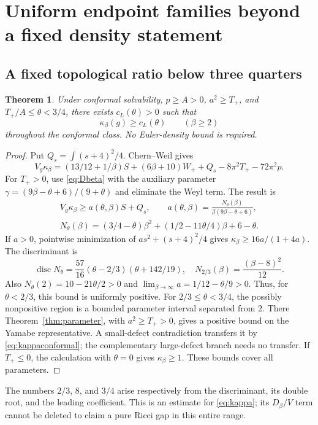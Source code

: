 \documentclass[11pt,a4paper]{article}
\newtheorem{theorem}{Theorem}[section]
\theoremstyle{definition}
\theoremstyle{remark}
\begin{document}
\section{Uniform endpoint families beyond a fixed density statement}
\subsection{A fixed topological ratio below three quarters}
\begin{theorem}\label{thm:Lprime}
Under conformal solvability, $p\ge A>0$, $a^2\ge T_+$, and
$T_+/A\le\theta<3/4$, there exists $c_L(\theta)>0$ such that
\begin{equation}
 \kappa_\beta(g)\ge c_L(\theta)\qquad(\beta\ge2)
 \label{eq:Lprime}
\end{equation}
throughout the conformal class. No Euler-density bound is required.
\end{theorem}
\begin{proof}
Put $Q_s=\int(s+4)^2/4$. Chern--Weil gives
\[
 V_g\kappa_\beta=(13/12+1/\beta)S+(6\beta+10)W_+
 +Q_s-8\pi^2T_+-72\pi^2p.
\]
For $T_+>0$, use \eqref{eq:Dbeta} with the auxiliary parameter
$\gamma=(9\beta-\theta+6)/(9+\theta)$ and eliminate the Weyl term. The result is
\begin{gather*}
 V_g\kappa_\beta\ge a(\theta,\beta)S+Q_s,\qquad
 a(\theta,\beta)=\frac{N_\theta(\beta)}{\beta(9\beta-\theta+6)},\\
 N_\theta(\beta)=(3/4-\theta)\beta^2+(1/2-11\theta/4)\beta+6-\theta.
\end{gather*}
If $a>0$, pointwise minimization of $as^2+(s+4)^2/4$ gives
$\kappa_\beta\ge16a/(1+4a)$. The discriminant is
\[
 \operatorname{disc}N_\theta
 =\frac{57}{16}(\theta-2/3)(\theta+142/19),\quad
 N_{2/3}(\beta)=\frac{(\beta-8)^2}{12}.
\]
Also $N_\theta(2)=10-21\theta/2>0$ and
$\lim_{\beta\to\infty}a=1/12-\theta/9>0$. Thus, for $\theta<2/3$, this bound is uniformly positive. For $2/3\le\theta<3/4$, the possibly nonpositive region is a bounded parameter interval separated from $2$. There Theorem~\ref{thm:parameter}, with $a^2\ge T_+>0$, gives a positive bound on the Yamabe representative. A small-defect contradiction transfers it by \eqref{eq:kappaconformal}; the complementary large-defect branch needs no transfer. If $T_+\le0$, the calculation with $\theta=0$ gives $\kappa_\beta\ge1$. These bounds cover all parameters.
\end{proof}
The numbers $2/3$, $8$, and $3/4$ arise respectively from the discriminant, its double root, and the leading coefficient. This is an estimate for \eqref{eq:kappa}; its $D_\beta/V$ term cannot be deleted to claim a pure Ricci gap in this entire range.
\end{document}
